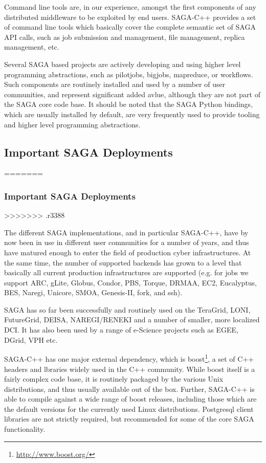 \documentclass[12pt]{article}
\begin{document}
  Command line tools are, in our experience, amongst the first
  components of any distributed middleware to be exploited by end
  users.  SAGA-C++ provides a set of command line tools which
  basically cover the complete semantic set of SAGA API calls, such as
  job submission and management, file management, replica management,
  etc.

  Several SAGA based projects are actively developing and using higher
  level programming abstractions, such as pilotjobs, bigjobs,
  mapreduce, or workflows.  Such components are routinely installed
  and used by a number of user communities, and represent significant
  added avlue, although they are not part of the SAGA core code base.
  It should be noted that the SAGA Python bindings, which are usually
  installed by default, are very frequently used to provide tooling and
  higher level programming abstractions.



 \subsection{Important SAGA Deployments}
=======
  \subsubsection{Important SAGA Deployments}
>>>>>>> .r3388

  The different SAGA implementations, and in particular SAGA-C++, have
  by now been in use in different user communities for a number of
  years, and thus have matured enough to enter the  field of
  production cyber infrastructures.  At the same time, the number of
  supported backends has grown to a level that basically all current
  production infrastructures are supported (e.g. for jobs we support
  ARC, gLite, Globus, Condor, PBS, Torque, DRMAA, EC2, Eucalyptus,
  BES,  Naregi, Unicore, SMOA, Genesis-II, fork, and ssh).  

  SAGA has so far been successfully and routinely used on the
  TeraGrid, LONI, FutureGrid, DEISA, NAREGI/RENEKI and a number of
  smaller, more localized DCI. It has also been used by a range of
  e-Science projects such as EGEE, DGrid, VPH etc.

  SAGA-C++ has one major external dependency, which is
  boost\footnote{\url{http://www.boost.org/}}, a set of C++ headers
  and lbraries widely used in the C++ community.  While boost itself
  is a fairly complex code base, it is routinely packaged by the
  various Unix distributions, and thus usually available out of the
  box.  Further, SAGA-C++ is able to compile against a wide range of
  boost releases, including those which are the default versions for
  the currently used Linux distributions.  Postgresql client libraries
  are not strictly required, but recommended for some of the core SAGA
  functionality.
\end{document}
